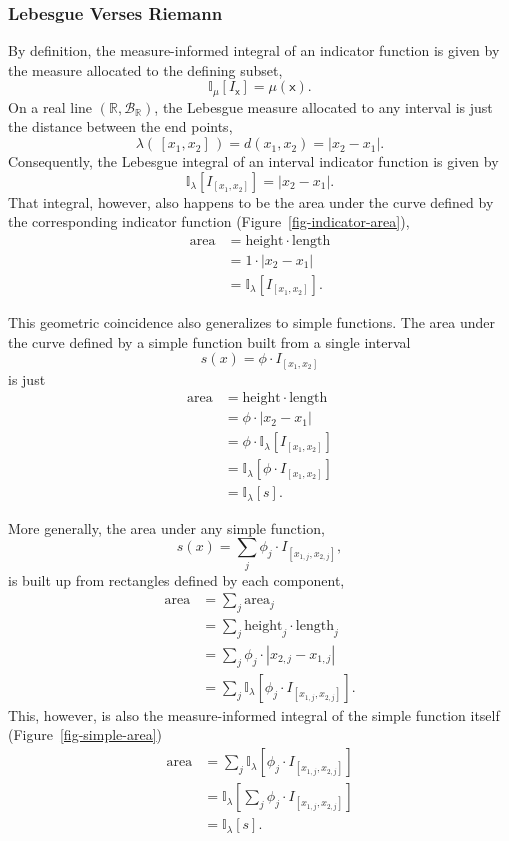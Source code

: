 \documentclass[
  letterpaper,
  DIV=11,
  numbers=noendperiod]{scrartcl}
\begin{document}
\subsubsection{Lebesgue Verses Riemann}\label{lebesgue-verses-riemann}

By definition, the measure-informed integral of an indicator function is
given by the measure allocated to the defining subset, \[
\mathbb{I}_{\mu}[I_{\mathsf{x}}] = \mu(\mathsf{x}).
\] On a real line \((\mathbb{R}, \mathcal{B}_{\mathbb{R}})\), the
Lebesgue measure allocated to any interval is just the distance between
the end points, \[
\lambda( \, [x_{1}, x_{2}] \, )
=
d(x_{1}, x_{2}) = | x_{2} - x_{1} |.
\] Consequently, the Lebesgue integral of an interval indicator function
is given by \[
\mathbb{I}_{\lambda}[I_{[x_{1}, x_{2}]}]
=
| x_{2} - x_{1} |.
\] That integral, however, also happens to be the area under the curve
defined by the corresponding indicator function
(Figure~\ref{fig-indicator-area}), \begin{align*}
\text{area}
&= \text{height} \cdot \text{length}
\\
&= 1 \cdot | x_{2} - x_{1} |
\\
&= \mathbb{I}_{\lambda}[I_{[x_{1}, x_{2}]}].
\end{align*}

This geometric coincidence also generalizes to simple functions. The
area under the curve defined by a simple function built from a single
interval \[
s(x) = \phi \cdot I_{[x_{1}, x_{2}]}
\] is just \begin{align*}
\text{area}
&= \text{height} \cdot \text{length}
\\
&= \phi \cdot | x_{2} - x_{1} |
\\
&= \phi \cdot \mathbb{I}_{\lambda}[I_{[x_{1}, x_{2}]}]
\\
&= \mathbb{I}_{\lambda}[\phi \cdot I_{[x_{1}, x_{2}]}]
\\
&= \mathbb{I}_{\lambda}[s].
\end{align*}

More generally, the area under any simple function, \[
s(x) = \sum_{j} \phi_{j} \cdot I_{[x_{1, j}, x_{2, j}]},
\] is built up from rectangles defined by each component, \begin{align*}
\text{area}
&=
\sum_{j} \text{area}_{j}
\\
&=
\sum_{j} \text{height}_{j} \cdot \text{length}_{j}
\\
&=
\sum_{j} \phi_{j} \cdot | x_{2, j} - x_{1, j} |
\\
&=
\sum_{j}
\mathbb{I}_{\lambda}[
  \phi_{j} \cdot I_{[x_{1, j}, x_{2, j}]}
].
\end{align*} This, however, is also the measure-informed integral of the
simple function itself (Figure~\ref{fig-simple-area}) \begin{align*}
\text{area}
&=
\sum_{j}
\mathbb{I}_{\lambda}[\phi_{j} \cdot I_{[x_{1, j}, x_{2, j}]}]
\\
&=
\mathbb{I}_{\lambda}[
  \sum_{j} \phi_{j} \cdot I_{[x_{1, j}, x_{2, j}]}
]
\\
&= \mathbb{I}_{\lambda}[s].
\end{align*}
\end{document}
